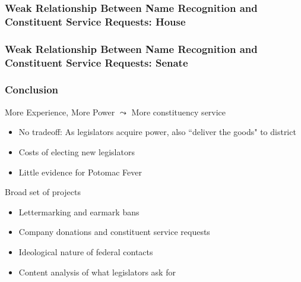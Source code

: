 \documentclass[xcolor=dvipsnames]{beamer}
\begin{document}
          
          \begin{frame}
          \frametitle<1>{Weak Relationship Between Name Recognition and Constituent Service Requests: House}
          \frametitle<2>{Weak Relationship Between Name Recognition and Constituent Service Requests: Senate}
          
          
          
          
          
          \end{frame}
          
          \begin{frame}
          \frametitle{Conclusion}
          
          More Experience, More Power $\leadsto$ More constituency service
          
          \begin{itemize}
          \item No tradeoff: As legislators acquire power, also ``deliver the goods" to district
          \item \alert{Costs} of electing new legislators 
          \item Little evidence for Potomac Fever
          \end{itemize}
          
          Broad set of projects 
          \begin{itemize}
          \item Lettermarking and earmark bans
          \item Company donations and constituent service requests
          \item Ideological nature of federal contacts
          \item Content analysis of what legislators ask for
          \end{itemize}	
          
          
          
          \end{frame}
          
          
          
          
          
\end{document}
